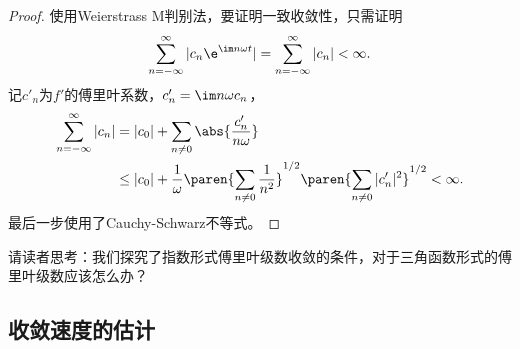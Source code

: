 \begin{proof}
    使用Weierstrass M判别法，要证明一致收敛性，只需证明
    \begin{equation}
        \sum_{n=-\infty}^{\infty}|c_n \e^{\im n\omega t}|=\sum_{n=-\infty}^{\infty}|c_n|<\infty.
    \end{equation}
    记$c'_n$为$f'$的傅里叶系数，$c'_n=\im n\omega c_n$，
    \begin{align}
        \sum_{n=-\infty}^{\infty}|c_n|&=|c_0|+\sum_{n\neq 0}\abs{\frac{c'_n}{n\omega}} \nonumber \\
        &\leq |c_0|+\frac{1}{\omega}\paren{\sum_{n\neq 0}\frac{1}{n^2}}^{1/2}\paren{\sum_{n\neq 0}|c'_n|^2}^{1/2}<\infty.
    \end{align}
    最后一步使用了Cauchy-Schwarz不等式。
\end{proof}

请读者思考：我们探究了指数形式傅里叶级数收敛的条件，对于三角函数形式的傅里叶级数应该怎么办？

\subsection{收敛速度的估计}\label{sub:converge_speed}

